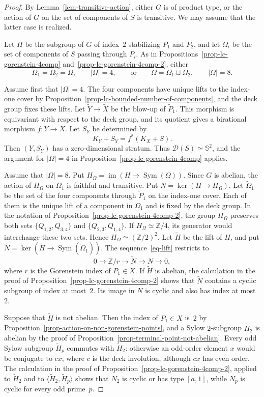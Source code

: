 \documentclass[11pt]{amsart}
\numberwithin{equation}{section}
\theoremstyle{definition}
\theoremstyle{remark}
\newcommand{\lra}{\longrightarrow}
\begin{document}
\begin{proof}
By Lemma~\ref{lem-transitive-action}, either $G$ is of product type, or the action of $G$ on the set of components of $S$ is transitive. We may assume that the latter case is realized. 

Let $H$ be the subgroup of $G$ of index~$2$ stabilizing $P_1$ and
$P_2$, and let $\Omega_i$ be the set of components of $S$ passing
through $P_i$. As in Propositions~\ref{prop-lc-gorenstein-4comp}
and~\ref{prop-lc-gorenstein-4comp-2}, either
\[
\Omega_1=\Omega_2=\Omega,\qquad |\Omega|=4,
\qquad\text{or}\qquad
\Omega=\Omega_1\sqcup\Omega_2,\qquad |\Omega|=8.
\]

Assume first that $|\Omega|=4$. The four components have unique lifts
to the index-one cover by
Proposition~\ref{prop-lc-bounded-number-of-components}, and the deck
group fixes these lifts. Let $\widetilde Y\to\widetilde X$ be the
blow-up of $\widetilde P_1$. This morphism is equivariant with respect
to the deck group, and its quotient gives a birational morphism
$f\colon Y\to X$. Let $S_Y$ be determined by
\[
K_Y+S_Y=f^*(K_X+S).
\]
Then $(Y,S_Y)$ has a zero-dimensional stratum. Thus
$\mathcal D(S)\simeq\mathbb S^2$, and the argument for $|\Omega|=4$
in Proposition~\ref{prop-lc-gorenstein-4comp} applies.

Assume that $|\Omega|=8$. Put $H_\Omega=\operatorname{im}(H\to\operatorname{Sym}(\Omega))$. Since $G$ is abelian, the action of $H_\Omega$ on $\Omega_1$ is faithful and transitive. Put $N=\ker(H\to H_\Omega)$. Let $\widetilde\Omega_1$ be the set of the four components through $\widetilde P_1$ on the index-one cover. Each of them is the unique lift of a component in $\Omega_1$ and is fixed by the deck group. In the notation of
Proposition~\ref{prop-lc-gorenstein-4comp-2}, the group $H_\Omega$
preserves both sets $\{Q_{1,2},Q_{3,4}\}$ and
$\{Q_{2,3},Q_{1,4}\}$.
If $H_\Omega\simeq\mathbb Z/4$, its generator would interchange these
two sets. Hence $H_\Omega\simeq(\mathbb Z/2)^2$.
Let $\widetilde H$ be the lift of $H$, and put
$\widetilde N=\ker(\widetilde H\to\operatorname{Sym}(\widetilde\Omega_1))$. The
sequence~\eqref{eq-lift} restricts to
\[
0\lra\mathbb Z/r\lra\widetilde N\lra N\lra0,
\]
where $r$ is the Gorenstein index of $P_1\in X$. If $\widetilde H$ is
abelian, the calculation in the proof of
Proposition~\ref{prop-lc-gorenstein-4comp-2} shows
that $\widetilde N$ contains a cyclic subgroup of index at most~$2$.
Its image in $N$ is cyclic and also has index at most~$2$.

Suppose that $\widetilde H$ is not abelian. Then the index of
$P_1\in X$ is~$2$ by
Proposition~\ref{prop-action-on-non-gorenstein-points}, and a Sylow
$2$-subgroup $\widetilde H_2$ is abelian by the proof of
Proposition~\ref{prop-terminal-point-not-abelian}. Every odd Sylow
subgroup $\widetilde H_p$ commutes with $\widetilde H_2$: otherwise an
odd-order element $x$ would be conjugate to $cx$, where $c$ is the
deck involution, although $cx$ has even order. The calculation in the
proof of Proposition~\ref{prop-lc-gorenstein-4comp-2}, applied to
$\widetilde H_2$ and to
$\langle\widetilde H_2,\widetilde H_p\rangle$ shows that $N_2$ is
cyclic or has type $[a,1]$, while $N_p$ is cyclic for every odd
prime~$p$.


\end{proof}
\end{document}
